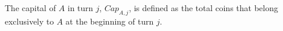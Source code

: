 {}
\begin{definition}[Capital]
  The capital of $A$ in turn $j$, $Cap_{A, j}$, is defined as the total coins that belong exclusively to $A$ at the
  beginning of turn $j$.
\end{definition}
